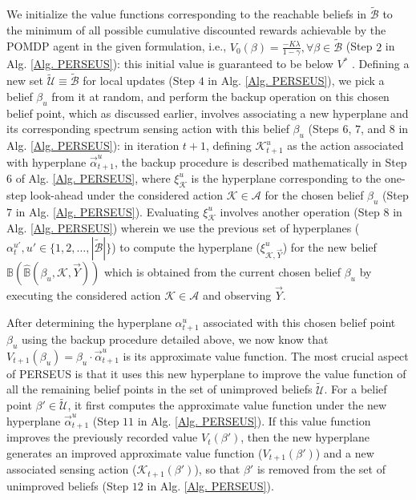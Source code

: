 \documentclass[12pt, draftcls, onecolumn]{IEEEtran}
\begin{document}
We initialize the value functions corresponding to the reachable beliefs in $\tilde{\mathcal{B}}$ to the minimum of all possible cumulative discounted rewards achievable by the POMDP agent in the given formulation, i.e., $V_{0}(\beta)=\frac{-K\lambda}{1{-}\gamma},{\forall}\beta{\in}\tilde{\mathcal{B}}$ \cite{Zhang_2001} (Step $2$ in Alg. \ref{Alg. PERSEUS}): this initial value is guaranteed to be below $V^{*}$ \cite{WCL:13}. Defining a new set $\tilde{\mathcal{U}}{\equiv}\tilde{\mathcal{B}}$ for local updates (Step $4$ in Alg. \ref{Alg. PERSEUS}), we pick a belief $\beta_{u}$ from it at random, and perform the backup operation on this chosen belief point, which as discussed earlier, involves associating a new hyperplane and its corresponding spectrum sensing action with this belief $\beta_{u}$ (Steps $6$, $7$, and $8$ in Alg. \ref{Alg. PERSEUS}): in iteration $t{+}1$, defining $\mathcal{K}_{t+1}^{u}$ as the action associated with hyperplane $\vec{\alpha}_{t+1}^{u}$, the backup procedure is described mathematically in Step $6$ of Alg. \ref{Alg. PERSEUS}, where $\xi_{\mathcal{K}}^{u}$ is the hyperplane corresponding to the one-step look-ahead under the considered action $\mathcal{K}{\in}\mathcal{A}$ for the chosen belief $\beta_{u}$ (Step $7$ in Alg. \ref{Alg. PERSEUS}). Evaluating $\xi_{\mathcal{K}}^{u}$ involves another operation (Step $8$ in Alg. \ref{Alg. PERSEUS}) wherein we use the previous set of hyperplanes ($\alpha_{t}^{u'},u'{\in}\{1,2,\dots,|\tilde{\mathcal{B}}|\}$) to compute the hyperplane ($\xi_{\mathcal{K},\vec{Y}}^{u}$) for the new belief $\mathbb{B}(\hat{\mathbb{B}}(\beta_{u},\mathcal{K},\vec{Y}))$ which is obtained from the current chosen belief $\beta_{u}$ by executing the considered action $\mathcal{K}{\in}\mathcal{A}$ and observing $\vec{Y}$.

After determining the hyperplane $\alpha_{t+1}^{u}$ associated with this chosen belief point $\beta_{u}$ using the backup procedure detailed above, we now know that $V_{t+1}(\beta_{u}){=}\beta_{u}{\cdot}\vec{\alpha}_{t+1}^{u}$ is its approximate value function. The most crucial aspect of PERSEUS is that it uses this new hyperplane to improve the value function of all the remaining belief points in the set of unimproved beliefs $\tilde{\mathcal{U}}$. For a belief point $\beta'\in\tilde{\mathcal{U}}$, it first computes the approximate value function under the new hyperplane $\vec{\alpha}_{t+1}^{u}$ (Step $11$ in Alg. \ref{Alg. PERSEUS}). If this value function improves the previously recorded value $V_{t}(\beta')$, then the new hyperplane generates an improved approximate value function ($V_{t+1}(\beta')$) and a new associated sensing action ($\mathcal{K}_{t+1}(\beta')$), so that $\beta'$ is removed from the set of unimproved beliefs (Step $12$ in Alg. \ref{Alg. PERSEUS}).
\end{document}
